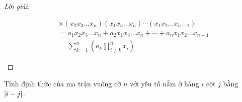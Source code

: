 \documentclass[class=linear-algebra,crop=false]{standalone}
\begin{document}
\begin{proof}[Lời giải]
\begin{enumerate}[label = (\alph*)]
\begin{align*}
			       & \times (x_{2}x_{3}\ldots x_{n}) (x_{1}x_{3}\ldots x_{n}) \cdots (x_{1}x_{2}\ldots x_{n-1})                                                       \\
			       & = a_{1}x_{2}x_{3}\ldots x_{n} + a_{2}x_{1}x_{3}\ldots x_{n} + \cdots + a_{n}x_{1}x_{2}\ldots x_{n-1}                                             \\
			       & = \sum^{n}_{k = 1}\left(a_{k}\prod^{n}_{i\ne k}x_{i}\right)
		      \end{align*}
		      \endgroup{}
	\end{enumerate}
\end{proof}

\begin{exercise}
	Tính định thức của ma trận vuông cỡ $n$ với yếu tố nằm ở hàng $i$ cột $j$ bằng $\left|{i - j}\right|$.
\end{exercise}
\end{document}
